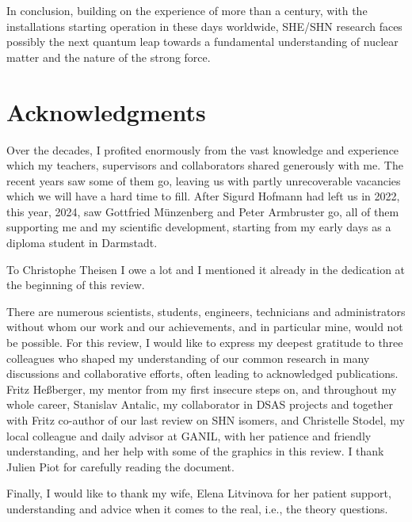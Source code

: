 In conclusion, building on the experience of more than a century, with the installations starting operation in these days worldwide, SHE/SHN research faces possibly the next quantum leap towards a fundamental understanding of nuclear matter and the nature of the strong force.



	\newpage
	\section*{Acknowledgments}
	Over the decades, I profited enormously from the vast knowledge and experience which my teachers, supervisors and collaborators shared generously with me. 
    The recent years saw some of them go, leaving us with partly unrecoverable vacancies which we will have a hard time to fill. 
    After Sigurd Hofmann had left us in 2022, this year, 2024, saw Gottfried Münzenberg and Peter Armbruster go, all of them supporting me and my scientific development, starting from my early days as a diploma student in Darmstadt. 
    
    To Christophe Theisen I owe a lot and I mentioned it already in the dedication at the beginning of this review. 
    
    There are numerous scientists, students, engineers, technicians and administrators without whom our work and our achievements, and in particular mine, would not be possible. 
    For this review, I would like to express my deepest gratitude to three colleagues who shaped my understanding of our common research in many discussions and collaborative efforts, often leading to acknowledged publications. 
    Fritz He{\ss}berger, my mentor from my first insecure steps on, and throughout my whole career, Stanislav Antalic, my collaborator in DSAS projects and together with Fritz co-author of our last review on SHN isomers, and  Christelle Stodel, my local colleague and daily advisor at GANIL, with her patience and friendly understanding, and her help with some of the graphics in this review. 
    I thank Julien Piot for carefully reading the document.
    
    Finally, I would like to thank my wife, Elena Litvinova for her patient support, understanding and advice when it comes to the real, i.e., the theory questions. 


